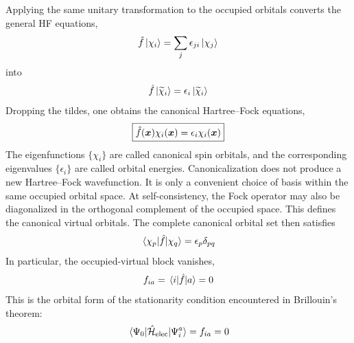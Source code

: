 \documentclass[11pt,a4paper,titlepage]{article}
\numberwithin{equation}{section}
\newcommand{\bx}{\boldsymbol{x}}
\newcommand{\hf}{\Hat{f}}
\newcommand{\chH}{\Hat{\mathcal{H}}}
\begin{document}
Applying the same unitary transformation to the occupied orbitals converts
the general HF equations,
\begin{equation}
  \hf\ket{\chi_i}
  =
  \sum_j
  \epsilon_{ji}\ket{\chi_j}
\end{equation}
into
\begin{equation}
  \hf\ket{\widetilde{\chi}_i}
  =
  \epsilon_i
  \ket{\widetilde{\chi}_i}
\end{equation}
Dropping the tildes, one obtains the
canonical Hartree--Fock equations,
\begin{equation}
  \boxed{
  \hf(\bx)\chi_i(\bx)
  =
  \epsilon_i\chi_i(\bx)
  }
  \label{eq:canonical-hf}
\end{equation}
The eigenfunctions $\{\chi_i\}$ are called
canonical spin orbitals, and the corresponding eigenvalues
$\{\epsilon_i\}$ are called orbital energies.
Canonicalization does not produce a new Hartree--Fock wavefunction. It is
only a convenient choice of basis within the same occupied orbital space.
At self-consistency, the Fock operator may also be diagonalized in the
orthogonal complement of the occupied space. This defines the
canonical virtual orbitals. The complete canonical orbital set then
satisfies
\begin{equation}
  \mel{\chi_p}{\hf}{\chi_q}
  =
  \epsilon_p\delta_{pq}
  \label{eq:canonical-fock-diagonal}
\end{equation}
In particular, the occupied-virtual block vanishes,
\begin{equation}
  f_{ia}
  =
  \mel{i}{\hf}{a}
  =
  0
  \label{eq:occupied-virtual-fock-zero}
\end{equation}
This is the orbital form of the stationarity condition encountered in
Brillouin's theorem:
\begin{equation}
  \mel{\Psi_0}{\chH_\text{elec}}{\Psi_i^a}
  =
  f_{ia}
  =
  0
\end{equation}

\end{document}
